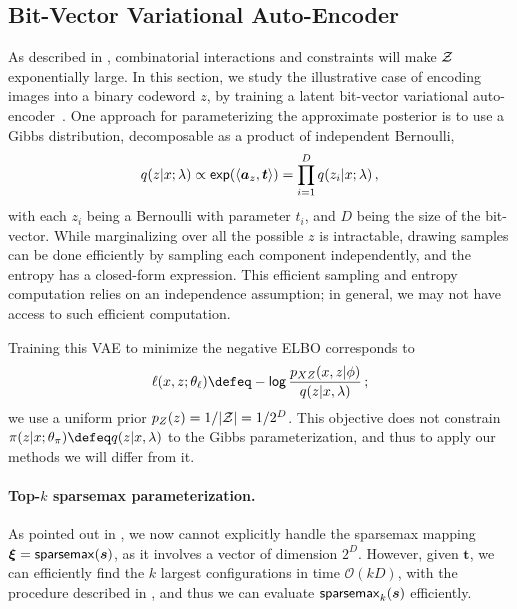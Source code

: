 \subsection{Bit-Vector Variational Auto-Encoder}\label{sec:bernvae}

\noindent As described in ,
combinatorial interactions and constraints will make $\mathcal{Z}$ exponentially
large. In this section, we study the illustrative case of encoding
images into a binary codeword $z$, by training a latent
bit-vector variational auto-encoder~\citep{GumbelSoftmax,
    mnih2014neural}. One approach for parameterizing the approximate
posterior is to use a Gibbs distribution, decomposable as a product
of independent Bernoulli,
%
\begin{equation}
    q(z |x; \lambda) \propto\operatorname*{\mathsf{exp}}(\langle\bm{a}_z,\bm{t}\rangle) = \prod_{i=1}^D q(z_i |x; \lambda)\,,
\end{equation}
%
with each $z_i$ being a Bernoulli with parameter $t_i$, and $D$ being
the size of the bit-vector. While marginalizing over all the
possible $z$ is intractable, drawing samples can be done
efficiently by sampling each component independently, and the entropy
has a closed-form expression.
This efficient sampling and entropy computation relies on an independence
assumption; in general, we may not have access to such efficient
computation.

Training this VAE to minimize the negative ELBO corresponds to
%
\begin{equation}
    \ell(x, z; \theta_\ell) \defeq - \log \frac{p_{XZ}(x, z | \phi)}{q(z | x, \lambda)}\,;
\end{equation}
%
we use a uniform prior $p_Z(z)=1/|\mathcal{Z}|=1/{2^D}$. This
objective does not constrain $\pi(z| x;\theta_\pi) \defeq q(z |x,
    \lambda)$ to the Gibbs parameterization, and thus to apply our
methods we will differ from it.

\paragraph*{Top-{\boldmath $k$} sparsemax parameterization.} As pointed
out in , we now cannot explicitly handle the
sparsemax mapping $\bm{\xi} = \operatorname*{\mathsf{sparsemax}}(\bm{s})$, as it
involves a vector of dimension $2^D$. However, given $\bm{t}$, we can
efficiently find the $k$ largest configurations in time
$\mathcal{O}(kD)$, with the procedure described in
, and thus we can evaluate $\operatorname{\mathsf{sparsemax}_\text{$k$}}(\bm{s})$
efficiently.

